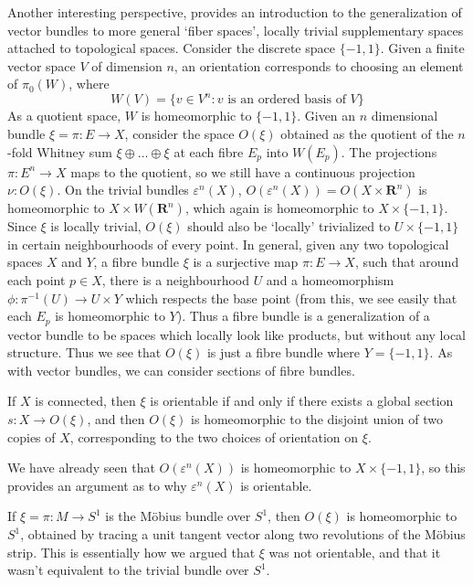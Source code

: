Another interesting perspective, provides an introduction to the generalization of vector bundles to more general `fiber spaces', locally trivial supplementary spaces attached to topological spaces. Consider the discrete space $\{ -1, 1 \}$. Given a finite vector space $V$ of dimension $n$, an orientation corresponds to choosing an element of $\pi_0(W)$, where
%
\[ W(V) = \{ v \in V^n: \text{$v$ is an ordered basis of $V$} \} \]
%
As a quotient space, $W$ is homeomorphic to $\{ -1, 1 \}$. Given an $n$ dimensional bundle $\xi = \pi: E \to X$, consider the space $O(\xi)$ obtained as the quotient of the $n$-fold Whitney sum $\xi \oplus \dots \oplus \xi$ at each fibre $E_p$ into $W(E_p)$. The projections $\pi: E^n \to X$ maps to the quotient, so we still have a continuous projection $\nu: O(\xi)$. On the trivial bundles $\varepsilon^n(X)$, $O(\varepsilon^n(X)) = O(X \times \mathbf{R}^n)$ is homeomorphic to $X \times W(\mathbf{R}^n)$, which again is homeomorphic to $X \times \{ -1, 1 \}$. Since $\xi$ is locally trivial, $O(\xi)$ should also be `locally' trivialized to $U \times \{ -1, 1 \}$ in certain neighbourhoods of every point. In general, given any two topological spaces $X$ and $Y$, a fibre bundle $\xi$ is a surjective map $\pi: E \to X$, such that around each point $p \in X$, there is a neighbourhood $U$ and a homeomorphism $\phi: \pi^{-1}(U) \to U \times Y$ which respects the base point (from this, we see easily that each $E_p$ is homeomorphic to $Y$). Thus a fibre bundle is a generalization of a vector bundle to be spaces which locally look like products, but without any local structure. Thus we see that $O(\xi)$ is just a fibre bundle where $Y = \{ -1, 1 \}$. As with vector bundles, we can consider sections of fibre bundles.

\begin{theorem}
    If $X$ is connected, then $\xi$ is orientable if and only if there exists a global section $s: X \to O(\xi)$, and then $O(\xi)$ is homeomorphic to the disjoint union of two copies of $X$, corresponding to the two choices of orientation on $\xi$.
\end{theorem}

\begin{example}
    We have already seen that $O(\varepsilon^n(X))$ is homeomorphic to $X \times \{ -1, 1 \}$, so this provides an argument as to why $\varepsilon^n(X)$ is orientable.
\end{example}

\begin{example}
    If $\xi = \pi: M \to S^1$ is the M\"{o}bius bundle over $S^1$, then $O(\xi)$ is homeomorphic to $S^1$, obtained by tracing a unit tangent vector along two revolutions of the M\"{o}bius strip. This is essentially how we argued that $\xi$ was not orientable, and that it wasn't equivalent to the trivial bundle over $S^1$.
\end{example}


